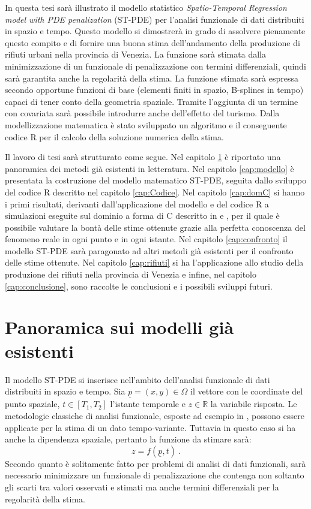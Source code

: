 \documentclass[a4paper,11pt,twoside,openright]{book}							%
\begin{document}
In questa tesi sarà illustrato il modello statistico \textit{Spatio-Temporal Regression model with PDE penalization} (ST-PDE) per l'analisi funzionale di dati distribuiti in spazio e tempo. Questo modello si dimostrerà in grado di assolvere pienamente questo compito e di fornire una buona stima dell'andamento della produzione di rifiuti urbani nella provincia di Venezia. La funzione sarà stimata dalla minimizzazione di un funzionale di penalizzazione con termini differenziali, quindi sarà garantita anche la regolarità della stima. La funzione stimata sarà espressa secondo opportune funzioni di base (elementi finiti in spazio, B-splines in tempo) capaci di tener conto della geometria spaziale. Tramite l'aggiunta di un termine con covariata sarà possibile introdurre anche dell'effetto del turismo. Dalla modellizzazione matematica è stato sviluppato un algoritmo e il conseguente codice R per il calcolo della soluzione numerica della stima. 

Il lavoro di tesi sarà strutturato come segue. Nel capitolo \ref{cap:panoramica} è riportato una panoramica dei metodi già esistenti in letteratura. Nel capitolo \ref{cap:modello} è presentata la costruzione del modello matematico ST-PDE, seguita dallo sviluppo del codice R descritto nel capitolo \ref{cap:Codice}. Nel capitolo \ref{cap:domC} si hanno i primi risultati, derivanti dall'applicazione del modello e del codice R a simulazioni eseguite sul dominio a forma di C descritto in \cite{art:ramsay} e \cite{art:wood}, per il quale è possibile valutare la bontà delle stime ottenute grazie alla perfetta conoscenza del fenomeno reale in ogni punto e in ogni istante. Nel capitolo \ref{cap:confronto} il modello ST-PDE sarà paragonato ad altri metodi già esistenti per il confronto delle stime ottenute. Nel capitolo \ref{cap:rifiuti} si ha l'applicazione allo studio della produzione dei rifiuti nella provincia di Venezia e infine, nel capitolo \ref{cap:conclusione}, sono raccolte le conclusioni e i possibili sviluppi futuri.
\newpage
\thispagestyle{empty}

\chapter{Panoramica sui modelli già esistenti}
\label{cap:panoramica}

Il modello ST-PDE si inserisce nell'ambito dell'analisi funzionale di dati distribuiti in spazio e tempo. Sia $\underline p = (x,y) \in \Omega$ il vettore con le coordinate del punto spaziale, $t \in [T_1,T_2]$ l'istante temporale e $z \in \mathbb{R}$ la variabile risposta. Le metodologie classiche di analisi funzionale, esposte ad esempio in \cite{art:ramsaysilverman}, possono essere applicate per la stima di un dato tempo-variante. Tuttavia in questo caso si ha anche la dipendenza spaziale, pertanto la funzione da stimare sarà:
$$
z=f(\underline p,t) \ .
$$
Secondo quanto è solitamente fatto per problemi di analisi di dati funzionali, sarà necessario minimizzare un funzionale di penalizzazione che contenga non soltanto gli scarti tra valori osservati e stimati ma anche termini differenziali per la regolarità della stima.
\end{document}
